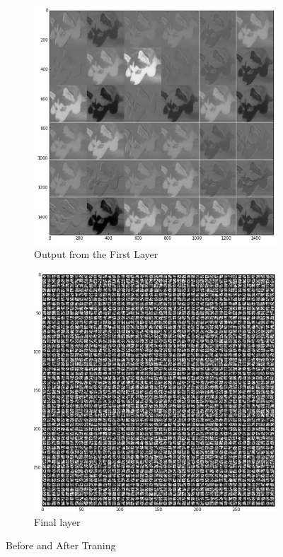 \begin{figure}[ht]
  \centering
  \begin{subfigure}{0.45\textwidth}
    \includegraphics[width=.9\linewidth]{img/Traning3.jpg}
    \caption{Output from the First Layer}
  \end{subfigure}%
  \hfill
  \begin{subfigure}{0.45\textwidth}
    \includegraphics[width=.9\linewidth]{img/Training6.jpg}
    \caption{Final layer}
  \end{subfigure}
  \caption{Before and After Traning}
  \label{fig:UI}
\end{figure}
\newpage
